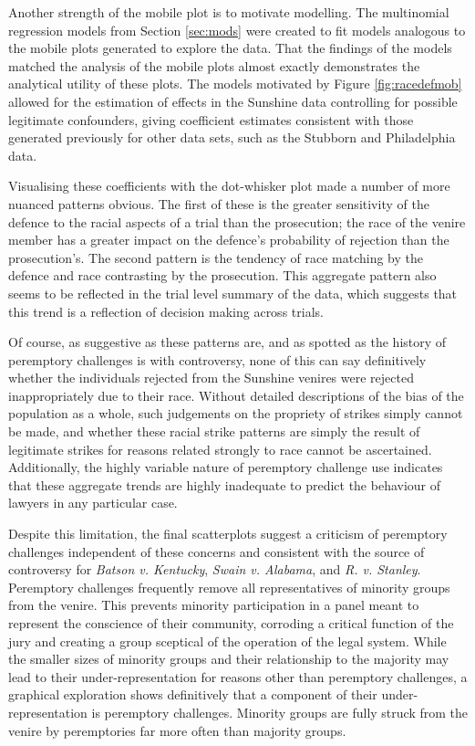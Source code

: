 \documentclass[12pt]{article}
\begin{document}
Another strength of the mobile plot is to motivate modelling. The multinomial regression models from Section \ref{sec:mods} were created to fit models analogous to the mobile plots generated to explore the data. That the findings of the models matched the analysis of the mobile plots almost exactly demonstrates the analytical utility of these plots. The models motivated by Figure \ref{fig:racedefmob} allowed for the estimation of effects in the Sunshine data controlling for possible legitimate confounders, giving coefficient estimates consistent with those generated previously for other data sets, such as the Stubborn and Philadelphia data.

Visualising these coefficients with the dot-whisker plot made a number of more nuanced patterns obvious. The first of these is the greater sensitivity of the defence to the racial aspects of a trial than the prosecution; the race of the venire member has a greater impact on the defence's probability of rejection than the prosecution's. The second pattern is the tendency of race matching by the defence and race contrasting by the prosecution. This aggregate pattern also seems to be reflected in the trial level summary of the data, which suggests that this trend is a reflection of decision making across trials.

Of course, as suggestive as these patterns are, and as spotted as the history of peremptory challenges is with controversy, none of this can say definitively whether the individuals rejected from the Sunshine venires were rejected inappropriately due to their race. Without detailed descriptions of the bias of the population as a whole, such judgements on the propriety of strikes simply cannot be made, and whether these racial strike patterns are simply the result of legitimate strikes for reasons related strongly to race cannot be ascertained. Additionally, the highly variable nature of peremptory challenge use indicates that these aggregate trends are highly inadequate to predict the behaviour of lawyers in any particular case.

Despite this limitation, the final scatterplots suggest a criticism of peremptory challenges independent of these concerns and consistent with the source of controversy for \textit{Batson v. Kentucky}, \textit{Swain v. Alabama}, and \textit{R. v. Stanley}. Peremptory challenges frequently remove all representatives of minority groups from the venire. This prevents minority participation in a panel meant to represent the conscience of their community, corroding a critical function of the jury and creating a group sceptical of the operation of the legal system. While the smaller sizes of minority groups and their relationship to the majority may lead to their under-representation for reasons other than peremptory challenges, a graphical exploration shows definitively that a component of their under-representation is peremptory challenges. Minority groups are fully struck from the venire by peremptories far more often than majority groups.
\end{document}
